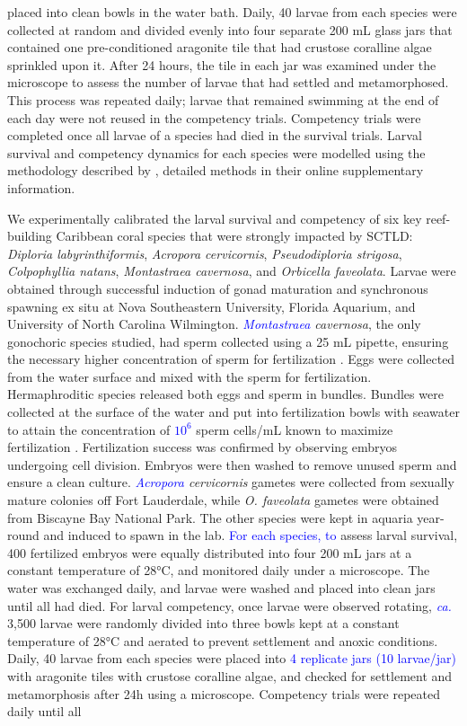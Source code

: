 \documentclass[preprint,12pt,authoryear]{elsarticle}
\newcommand{\modif}[1]{\textcolor{blue}{#1}}
\begin{document}
placed into clean bowls in the water bath. Daily, 40 larvae from each species were collected at random and divided evenly into four separate 200 mL glass jars that contained one pre-conditioned aragonite tile that had crustose coralline algae sprinkled upon it. After 24 hours, the tile in each jar was examined under the microscope to assess the number of larvae that had settled and metamorphosed. This process was repeated daily; larvae that remained swimming at the end of each day were not reused in the competency trials. Competency trials were completed once all larvae of a species had died in the survival trials. Larval survival and competency dynamics for each species were modelled using the methodology described by \cite{figueiredo2022global}, detailed methods in their online supplementary information.
	
	We experimentally calibrated the larval survival and competency of six key reef-building Caribbean coral species that were strongly impacted by SCTLD: \textit{Diploria labyrinthiformis}, \textit{Acropora cervicornis}, \textit{Pseudodiploria strigosa}, \textit{Colpophyllia natans}, \textit{Montastraea cavernosa}, and \textit{Orbicella faveolata}. Larvae were obtained through successful induction of gonad maturation and synchronous spawning ex situ at Nova Southeastern University, Florida Aquarium, and University of North Carolina Wilmington. \textit{\modif{Montastraea} cavernosa}, the only gonochoric species studied, had sperm collected using a 25 mL pipette, ensuring the necessary higher concentration of sperm for fertilization \citep{fogarty2012asymmetric, fogarty2012weak, dela2020optimising}. Eggs were collected from the water surface and mixed with the sperm for fertilization. Hermaphroditic species released both eggs and sperm in bundles. Bundles were collected at the surface of the water and put into fertilization bowls with seawater to attain the concentration of \modif{$10^6$} sperm cells/mL known to maximize fertilization \citep{fogarty2012asymmetric, fogarty2012weak, dela2020optimising}. Fertilization success was confirmed by observing embryos undergoing cell division. Embryos were then washed to remove unused sperm and ensure a clean culture. \textit{\modif{Acropora} cervicornis} gametes were collected from sexually mature colonies off Fort Lauderdale, while \textit{O. faveolata} gametes were obtained from Biscayne Bay National Park. The other species were kept in aquaria year-round and induced to spawn in the lab. \modif{For each species, to} assess larval survival, 400 fertilized embryos were equally distributed into four 200 mL jars at a constant temperature of 28°C, and monitored daily under a microscope. The water was exchanged daily, and larvae were washed and placed into clean jars until all had died. For larval competency, once larvae were observed rotating, \modif{\textit{ca.}} 3,500 larvae were randomly divided into three bowls kept at a constant temperature of 28°C and aerated to prevent settlement and anoxic conditions. Daily, 40 larvae from each species were placed into \modif {4 replicate jars (10 larvae/jar)} with aragonite tiles with crustose coralline algae, and checked for settlement and metamorphosis after 24h using a microscope. Competency trials were repeated daily until all 
\end{document}
